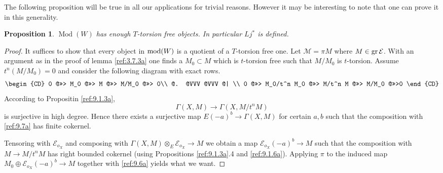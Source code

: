 \documentclass{amsproc}
\def\Escr{{\mathcal E}}
\def\Mscr{{\mathcal M}}
\def\mod{\mathop{\text{mod}}}
\def\gr{\mathop{\text{gr}}}
\def\gr{\operatorname {gr}}
\def\gr{\operatorname {gr}}
\def\Qch{\operatorname {Mod}}
\def\r{\rightarrow}
\let\oldtext\text
\def\text#1{\oldtext{\upshape #1}}
\newtheorem{propositions}[lemmas]{Proposition}
\theoremstyle{definition}
\theoremstyle{remark}
\numberwithin{equation}{section}
\numberwithin{table}{section}
\numberwithin{figure}{section}
\def\gr{\mathop{\text{gr}}}
\begin{document}
The following proposition will be true in all our applications for
trivial reasons. However it may be interesting to note that one can
prove it in this generality.
\begin{propositions} 
$\Qch(W)$ has enough $T$-torsion free objects. In particular $Lj^\ast$
is defined.
\end{propositions}
\begin{proof}
  It suffices to show that every object in $\mod(W)$ is a quotient of
  a $T$-torsion free one. Let $\Mscr=\pi M$ where $M\in\gr \Escr$.
  With an argument as in the proof of lemma \ref{ref:3.7.3a} one
  finds a $M_0\subset M$ which is $t$-torsion free such that $M/M_0$ is
  $t$-torsion. Assume $t^n(M/M_0)=0$ and consider the following
  diagram with exact rows.
\begin{equation}
\label{ref:9.6a}
\begin{CD}
0 @>>> M_0 @>>> M @>>> M/M_0 @>>> 0\\
@. @VVV @VVV @|  \\
0 @>>> M_0/t^n M_0 @>>> M/t^n M @>>> M/M_0 @>>>0
\end{CD}
\end{equation}
According to Propositin \ref{ref:9.1.3a},
\begin{equation}
\label{ref:9.7a}
\Gamma(X,M)\r
\Gamma(X,M/t^n M)
\end{equation}
 is surjective in high degree. Hence there exists a
surjective map $E(-a)^b\r \Gamma(X,M)$ for certain $a,b$ such that the
composition with \eqref{ref:9.7a} has finite cokernel.

Tensoring with $\Escr_{o_X}$ and composing with $\Gamma(X,M)\otimes_E
\Escr_{o_X}\r M$ we obtain a map $\Escr_{o_X}(-a)^b\r M$ such that the
composition with $M\r M/t^n M$ has right bounded cokernel (using
Propositions \ref{ref:9.1.3a}.4 and
\ref{ref:9.1.6a}). Applying $\pi$ to the induced map $M_0\oplus
\Escr_{o_X}(-a)^b\r M$ together with \eqref{ref:9.6a} yields what we
want. 
\end{proof}
\end{document}
